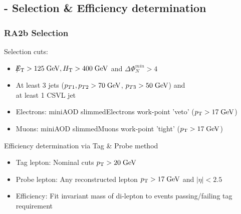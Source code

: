 \documentclass{beamer}
\begin{document}
\subsection{\Zll - Selection \& Efficiency determination}
\begin{frame}
\frametitle{RA2b Selection}
Selection cuts:
\begin{itemize}
 \item $\slash\mkern-12mu{E}_{\text{T}} > 125 \;\text{Ge}\kern-0.06667em\text{V}, H_{\text{T}} > 400 \;\text{Ge}\kern-0.06667em\text{V} $ and $\Delta\Phi_{N}^{min}>4$
 \item At least 3 jets ($p_{T\text{1}},p_{T\text{2}} > 70\;\text{Ge}\kern-0.06667em\text{V}$, $p_{T\text{3}} > 50\;\text{Ge}\kern-0.06667em\text{V}$) and \\ at least 1 CSVL jet
 \item Electrons: miniAOD slimmedElectrons work-point 'veto' ($p_{\text{T}}>17\;\text{Ge}\kern-0.06667em\text{V}$)
 \item Muons: miniAOD slimmedMuons work-point 'tight' ($p_{\text{T}}>17\;\text{Ge}\kern-0.06667em\text{V}$)
\end{itemize}
Efficiency determination via Tag \& Probe method
\begin{itemize}
 \item Tag lepton: Nominal cuts $p_{\text{T}}>20\;\text{Ge}\kern-0.06667em\text{V}$
 \item Probe lepton: Any reconstructed lepton $p_{\text{T}}>17\;\text{Ge}\kern-0.06667em\text{V}$ and $|\eta|<2.5$
 \item Efficiency: Fit invariant mass of di-lepton to events passing/failing tag requirement
\end{itemize}
\end{frame}

\end{document}
